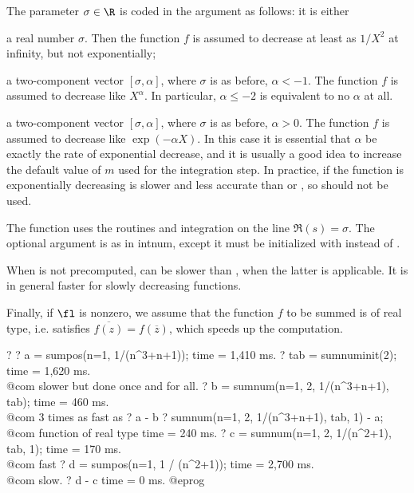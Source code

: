 The parameter $\sigma\in\R$ is coded in the argument  as follows: it
is either

\item a real number $\sigma$. Then the function $f$ is assumed to
decrease at least as $1/X^2$ at infinity, but not exponentially;

\item a two-component vector $[\sigma,\alpha]$, where $\sigma$ is as
before, $\alpha < -1$. The function $f$ is assumed to decrease like
$X^{\alpha}$. In particular, $\alpha\le-2$ is equivalent to no $\alpha$ at all.

\item a two-component vector $[\sigma,\alpha]$, where $\sigma$ is as
before, $\alpha > 0$. The function $f$ is assumed to decrease like
$\exp(-\alpha X)$. In this case it is essential that $\alpha$ be exactly the
rate of exponential decrease, and it is usually a good idea to increase
the default value of $m$ used for the integration step. In practice, if
the function is exponentially decreasing  is slower and less
accurate than  or , so should not be used.

The function uses the  routines and integration on the line
$\Re(s) = \sigma$. The optional argument  is as in intnum, except it
must be initialized with  instead of .

When  is not precomputed,  can be slower than
, when the latter is applicable. It is in general faster for
slowly decreasing functions.

Finally, if $\fl$ is nonzero, we assume that the function $f$ to be summed is
of real type, i.e. satisfies $\overline{f(z)}=f(\overline{z})$, which
speeds up the computation.

\bprog
? 
? a = sumpos(n=1, 1/(n^3+n+1));
time = 1,410 ms.
? tab = sumnuminit(2);
time = 1,620 ms. \\@com slower but done once and for all.
? b = sumnum(n=1, 2, 1/(n^3+n+1), tab);
time = 460 ms. \\@com 3 times as fast as 
? a - b
? sumnum(n=1, 2, 1/(n^3+n+1), tab, 1) - a; \\@com function of real type
time = 240 ms.
? c = sumnum(n=1, 2, 1/(n^2+1), tab, 1);
time = 170 ms. \\@com fast
? d = sumpos(n=1, 1 / (n^2+1));
time = 2,700 ms. \\@com slow.
? d - c
time = 0 ms.
@eprog

